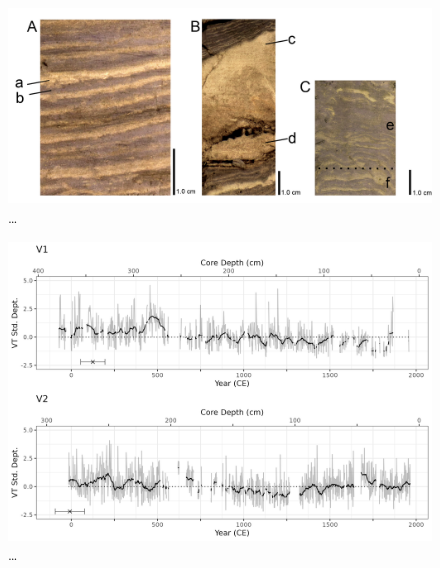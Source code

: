 \documentclass[
  letterpaper,
  DIV=11,
  numbers=noendperiod]{scrartcl}
\begin{document}
\begin{figure}

{\centering \includegraphics[width=1\textwidth,height=\textheight]{figs/good_vs_flood_vs_disturbed_varves_.png}

}

\caption{\label{fig-varve-turb}\ldots{}}

\end{figure}

\begin{figure}

{\centering \includegraphics[width=1\textwidth,height=\textheight]{figs/V1_V2_varvethickness_vs_depth_and_C14_est_yr_ma.png}

}

\caption{\label{fig-varves-a}\ldots{}}

\end{figure}
\end{document}
